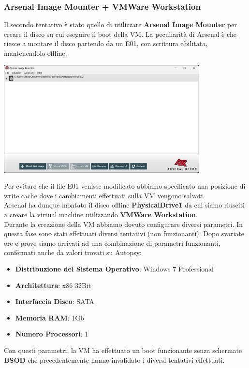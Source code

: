 \subsubsection{Arsenal Image Mounter + VMWare Workstation}
Il secondo tentativo è stato quello di utilizzare \textbf{Arsenal Image Mounter} per creare il disco su cui eseguire il boot della VM. La peculiarità di Arsenal è che riesce a montare il disco partendo da un E01, con scrittura abilitata, mantenendolo offline.
\begin{center}
    \includegraphics[width=0.8\textwidth]{img/arsenal-imager.png}
\end{center}
Per evitare che il file E01 venisse modificato abbiamo specificato una posizione di write cache dove i cambiamenti effettuati sulla VM vengono salvati.\\
Arsenal ha dunque montato il disco offline \textbf{PhysicalDrive1} da cui siamo riusciti a creare la virtual machine utilizzando \textbf{VMWare Workstation}.\vspace{14pt}\\
Durante la creazione della VM abbiamo dovuto configurare diversi parametri. In questa fase sono stati effettuati diversi tentativi (non funzionanti). Dopo svariate ore e prove siamo arrivati ad una combinazione di parametri funzionanti, confermati anche da valori trovati su Autopsy:
\begin{itemize}
    \item \textbf{Distribuzione del Sistema Operativo}: Windows 7 Professional
    \item \textbf{Architettura}: x86 32Bit
    \item \textbf{Interfaccia Disco}: SATA
    \item \textbf{Memoria RAM}: 1Gb
    \item \textbf{Numero Processori}: 1 
\end{itemize}
Con questi parametri, la VM ha effettuato un boot funzionante senza schermate \textbf{BSOD} che precedentemente hanno invalidato i diversi tentativi effettuati.
